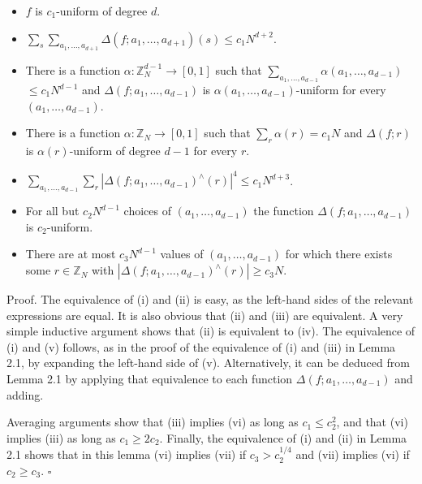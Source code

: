 \documentclass[10pt]{article}
\begin{document}
\begin{itemize}
  \item[(i)] $f$ is $c_{1}$-uniform of degree $d$.
  \item[(ii)] $\sum_{s} \sum_{a_{1}, \ldots, a_{d+1}} \Delta\left(f ; a_{1}, \ldots, a_{d+1}\right)(s) \leqslant c_{1} N^{d+2}$.
  \item[(iii)] There is a function $\alpha: \mathbb{Z}_{N}^{d-1} \rightarrow[0,1]$ such that $\sum_{a_{1}, \ldots, a_{d-1}} \alpha\left(a_{1}, \ldots, a_{d-1}\right)$ $\leqslant c_{1} N^{d-1}$ and $\Delta\left(f ; a_{1}, \ldots, a_{d-1}\right)$ is $\alpha\left(a_{1}, \ldots, a_{d-1}\right)$-uniform for every $\left(a_{1}, \ldots, a_{d-1}\right)$.
  \item[(iv)] There is a function $\alpha: \mathbb{Z}_{N} \rightarrow[0,1]$ such that $\sum_{r} \alpha(r)=c_{1} N$ and $\Delta(f ; r)$ is $\alpha(r)$-uniform of degree $d-1$ for every $r$.
  \item[(v)] $\sum_{a_{1}, \ldots, a_{d-1}} \sum_{r}\left|\Delta\left(f ; a_{1}, \ldots, a_{d-1}\right)^{\wedge}(r)\right|^{4} \leqslant c_{1} N^{d+3}$.
  \item[(vi)] For all but $c_{2} N^{d-1}$ choices of $\left(a_{1}, \ldots, a_{d-1}\right)$ the function $\Delta\left(f ; a_{1}, \ldots, a_{d-1}\right)$ is $c_{2}$-uniform.
\end{itemize}

\begin{itemize}
  \item[(vii)] There are at most $c_{3} N^{d-1}$ values of $\left(a_{1}, \ldots, a_{d-1}\right)$ for which there exists some $r \in \mathbb{Z}_{N}$ with $\left|\Delta\left(f ; a_{1}, \ldots, a_{d-1}\right)^{\wedge}(r)\right| \geqslant c_{3} N$.
\end{itemize}

Proof. The equivalence of (i) and (ii) is easy, as the left-hand sides of the relevant expressions are equal. It is also obvious that (ii) and (iii) are equivalent. A very simple inductive argument shows that (ii) is equivalent to (iv). The equivalence of (i) and (v) follows, as in the proof of the equivalence of (i) and (iii) in Lemma 2.1, by expanding the left-hand side of (v). Alternatively, it can be deduced from Lemma 2.1 by applying that equivalence to each function $\Delta\left(f ; a_{1}, \ldots, a_{d-1}\right)$ and adding.

Averaging arguments show that (iii) implies (vi) as long as $c_{1} \leqslant c_{2}^{2}$, and that (vi) implies (iii) as long as $c_{1} \geqslant 2 c_{2}$. Finally, the equivalence of (i) and (ii) in Lemma 2.1 shows that in this lemma (vi) implies (vii) if $c_{3}>c_{2}^{1 / 4}$ and (vii) implies (vi) if $c_{2} \geqslant c_{3}$. \(\square\)
\end{document}
